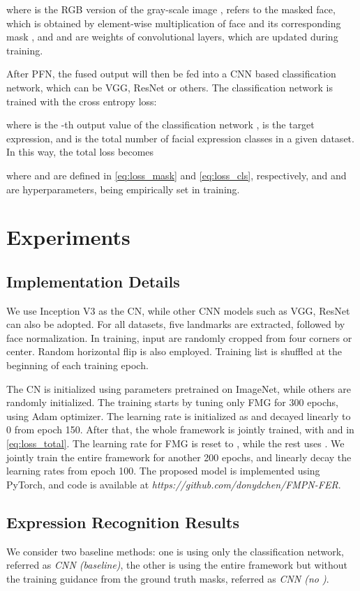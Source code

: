 \documentclass[conference,a4paper]{IEEEtran}
\begin{document}
where  is the RGB version of the gray-scale image ,  refers to the masked face, which is obtained by element-wise multiplication of face  and its corresponding mask , and  and  are weights of convolutional layers, which are updated during training.

After PFN, the fused output  will then be fed into a CNN based classification network, which can be VGG, ResNet or others. The classification network is trained with the cross entropy loss:

where  is the -th output value of the classification network ,  is the target expression, and  is the total number of facial expression classes in a given dataset.
In this way, the total loss becomes

where  and  are defined in \eqref{eq:loss_mask} and \eqref{eq:loss_cls}, respectively, and  and  are hyperparameters, being empirically set in training. 


\section{Experiments}


\subsection{Implementation Details}
We use Inception V3 as the CN, while other CNN models such as VGG, ResNet can also be adopted. For all datasets, five landmarks are extracted, followed by face normalization.
In training, input are randomly cropped from four corners or center. 
Random horizontal flip is also employed. 
Training list is shuffled at the beginning of each training epoch.


The CN is initialized using parameters pretrained on ImageNet, while others are randomly initialized. The training starts by tuning only FMG for 300 epochs, using Adam optimizer. The learning rate is initialized as  and decayed linearly to 0 from epoch 150. After that, the whole framework is jointly trained, with  and  in \eqref{eq:loss_total}. The learning rate for FMG is reset to , while the rest uses . We jointly train the entire framework for another 200 epochs, and linearly decay the learning rates from epoch 100. The proposed model is implemented using PyTorch, and code is available at 
\textit{https://github.com/donydchen/FMPN-FER}.







\subsection{Expression Recognition Results}
We consider two baseline methods: one is using only the classification network, referred as \textit{CNN (baseline)}, the other is using the entire framework but without the training guidance from the ground truth masks, referred as \textit{CNN (no )}. 
\end{document}
